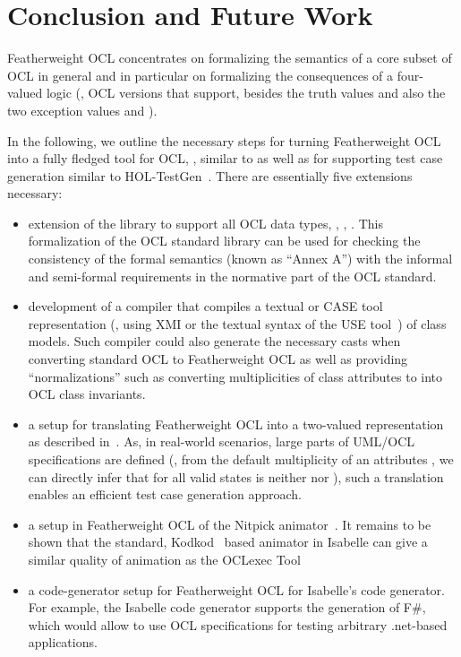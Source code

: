 \section{Conclusion and Future Work}
Featherweight OCL concentrates on formalizing the semantics of a core
subset of OCL in general and in particular on formalizing the
consequences of a four-valued logic (\ie, OCL versions that support,
besides the truth values  and  also
the two exception values  and ).

In the following, we outline the necessary steps for turning
Featherweight OCL into a fully fledged tool for OCL, \eg, similar to
\holocl as well as for supporting test case generation similar to
{HOL}-TestGen~\cite{brucker.ea:hol-testgen:2009}.  There are
essentially five extensions necessary:
\begin{itemize}
\item extension of  the library to support all OCL data types, \eg,
  , . %
  This formalization of the OCL standard library can be used for
  checking the consistency of the formal semantics (known as ``Annex
  A'') with the informal and semi-formal requirements in the normative
  part of the OCL standard.
\item development of a compiler that compiles a textual or CASE
  tool representation (\eg, using XMI or the textual syntax of
  the USE tool~\cite{richters:precise:2002}) of class
  models. Such compiler could also generate the necessary casts when
  converting standard OCL to Featherweight OCL as well as providing
  ``normalizations'' such as converting multiplicities of class
  attributes to into OCL class invariants.
\item a setup for translating Featherweight OCL into a two-valued
  representation as described
  in~\cite{brucker.ea:ocl-testing:2010}. As, in real-world scenarios,
  large parts of {UML}/{OCL} specifications are defined (\eg,
  from the default multiplicity  of an attributes
  , we can directly infer that for all valid states
   is neither  nor ),
  such a translation enables an efficient test case generation
  approach.
\item a setup in Featherweight OCL of the Nitpick
  animator~\cite{blanchette.ea:nitpick:2010}. It remains to be shown
  that the standard, Kodkod~\cite{torlak.ea:kodkod:2007} based
  animator in Isabelle can give a similar quality of animation as the
  OCLexec Tool~\cite{krieger.ea:generative:2010}
\item a code-generator setup for Featherweight OCL for Isabelle's
  code generator. For example, the Isabelle code generator supports
  the generation of F\#, which would allow to use {OCL}
  specifications for testing arbitrary .net-based applications.
\end{itemize}
